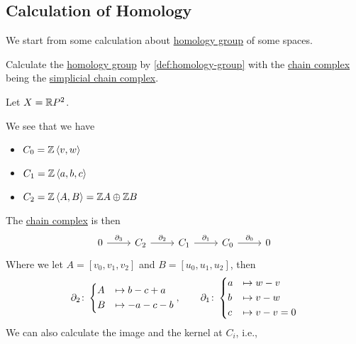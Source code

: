 \subsection{Calculation of Homology}
We start from some calculation about \hyperref[def:homology-group]{homology group} of some spaces.
\begin{eg}
	Calculate the \hyperref[def:homology-group]{homology group} by \autoref{def:homology-group} with the \hyperref[def:chain-complex]{chain complex}
	being the \hyperref[def:simplicial-complex]{simplicial chain complex}.
\end{eg}
\begin{explanation}
	Let \(X = \mathbb{\MakeUppercase{r}} P^{2} \).
	\begin{figure}[H]
		\centering
		\label{fig:eg:homology-RP2}
	\end{figure}
	We see that we have
	\begin{itemize}
		\item \(C_0 = \mathbb{\MakeUppercase{z}} \left< v, w \right> \)
		\item \(C_1 = \mathbb{\MakeUppercase{z}} \left< a, b, c \right> \)
		\item \(C_2 = \mathbb{\MakeUppercase{z}} \left< A, B \right> = \mathbb{\MakeUppercase{z}} A \oplus \mathbb{\MakeUppercase{z}} B\)
	\end{itemize}
	The \hyperref[def:chain-complex]{chain complex} is then
	\[
		\begin{tikzcd}
			0 & {C_2} & {C_1} & {C_0} & 0
			\arrow["{\partial_3}", from=1-1, to=1-2]
			\arrow["{\partial_2}", from=1-2, to=1-3]
			\arrow["{\partial_1}", from=1-3, to=1-4]
			\arrow["{\partial_0}", from=1-4, to=1-5]
		\end{tikzcd}
	\]
	Where we let \(A = [v_0, v_1, v_2]\) and \(B = [u_0, u_1, u_2]\), then
	\[
		\partial_2\colon \begin{dcases}
			A & \mapsto b - c + a \\
			B & \mapsto -a-c-b    \\
		\end{dcases},\qquad \partial_1\colon \begin{dcases}
			a & \mapsto w - v     \\
			b & \mapsto v - w     \\
			c & \mapsto v - v = 0 \\
		\end{dcases}
	\]
	We can also calculate the image and the kernel at \(C_{i} \), i.e.,

\end{explanation}
